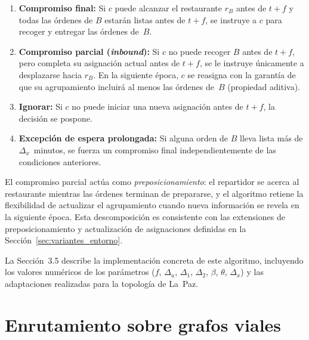 \documentclass[12pt,letterpaper,oneside]{book}
\begin{document}
	\begin{enumerate}
		\item \textbf{Compromiso final:} Si $c$ puede alcanzar el restaurante
		      $r_B$ antes de $t + f$ y todas las órdenes de $B$ estarán listas
		      antes de $t + f$, se instruye a $c$ para recoger y entregar las
		      órdenes de~$B$.

		\item \textbf{Compromiso parcial (\textit{inbound}):} Si $c$ no puede
		      recoger $B$ antes de $t + f$, pero completa su asignación actual
		      antes de $t + f$, se le instruye únicamente a desplazarse hacia
		      $r_B$.  En la siguiente época, $c$ se reasigna con la garantía de
		      que su agrupamiento incluirá al menos las órdenes de~$B$
		      (propiedad aditiva).

		\item \textbf{Ignorar:} Si $c$ no puede iniciar una nueva asignación
		      antes de $t + f$, la decisión se pospone.

		\item \textbf{Excepción de espera prolongada:} Si alguna orden de $B$
		      lleva lista más de $\Delta_x$~minutos, se fuerza un compromiso final
		      independientemente de las condiciones anteriores.
	\end{enumerate}

	El compromiso parcial actúa como \textit{preposicionamiento}: el repartidor
	se acerca al restaurante mientras las órdenes terminan de prepararse, y el
	algoritmo retiene la flexibilidad de actualizar el agrupamiento cuando
	nueva información se revela en la siguiente época.  Esta descomposición es
	consistente con las extensiones de preposicionamiento y actualización de
	asignaciones definidas en la Sección~\ref{sec:variantes_entorno}.

	La Sección~3.5 describe la implementación concreta de este algoritmo,
	incluyendo los valores numéricos de los parámetros ($f$, $\Delta_u$,
	$\Delta_1$, $\Delta_2$, $\beta$, $\theta$, $\Delta_x$) y las adaptaciones
	realizadas para la topología de La~Paz.

	\section{Enrutamiento sobre grafos viales}
\end{document}
